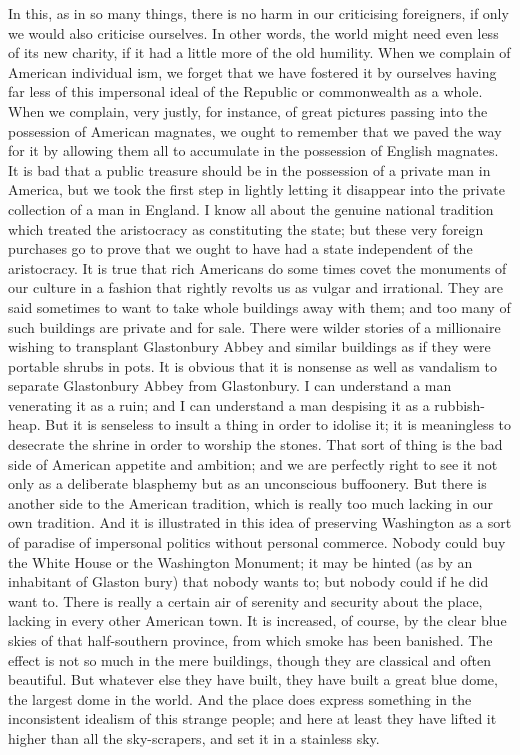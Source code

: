 \documentclass{book}
\begin{document}
In this, as in so many things, there is no harm in our criticising foreigners, if only we would also criticise ourselves. In other words, the world might need even less of its new charity, if it had a little more of the old humility. When we complain of American individual ism, we forget that we have fostered it by ourselves having far less of this impersonal ideal of the Republic or commonwealth as a whole. When we complain, very justly, for instance, of great pictures passing into the possession of American magnates, we ought to remember that we paved the way for it by allowing them all to accumulate in the possession of English magnates. It is bad that a public treasure should be in the possession of a private man in America, but we took the first step in lightly letting it disappear into the private collection of a man in England. I know all about the genuine national tradition which treated the aristocracy as constituting the state; but these very foreign purchases go to prove that we ought to have had a state independent of the aristocracy. It is true that rich Americans do some times covet the monuments of our culture in a fashion that rightly revolts us as vulgar and irrational. They are said sometimes to want to take whole buildings away with them; and too many of such buildings are private and for sale. There were wilder stories of a millionaire wishing to transplant Glastonbury Abbey and similar buildings as if they were portable shrubs in pots. It is obvious that it is nonsense as well as vandalism to separate Glastonbury Abbey from Glastonbury. I can understand a man venerating it as a ruin; and I can understand a man despising it as a rubbish-heap. But it is senseless to insult a thing in order to idolise it; it is meaningless to desecrate the shrine in order to worship the stones. That sort of thing is the bad side of American appetite and ambition; and we are perfectly right to see it not only as a deliberate blasphemy but as an unconscious buffoonery. But there is another side to the American tradition, which is really too much lacking in our own tradition. And it is illustrated in this idea of preserving Washington as a sort of paradise of impersonal politics without personal commerce. Nobody could buy the White House or the Washington Monument; it may be hinted (as by an inhabitant of Glaston bury) that nobody wants to; but nobody could if he did want to. There is really a certain air of serenity and security about the place, lacking in every other American town. It is increased, of course, by the clear blue skies of that half-southern province, from which smoke has been banished. The effect is not so much in the mere buildings, though they are classical and often beautiful. But whatever else they have built, they have built a great blue dome, the largest dome in the world. And the place does express something in the inconsistent idealism of this strange people; and here at least they have lifted it higher than all the sky-scrapers, and set it in a stainless sky.
\end{document}
